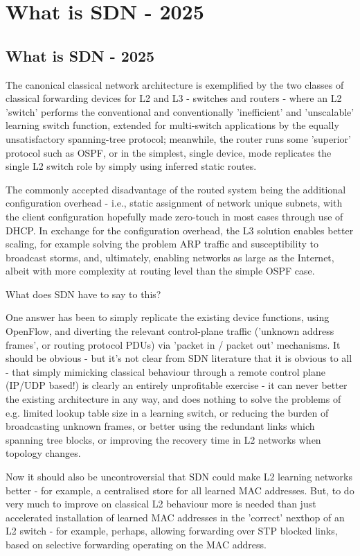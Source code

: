 \section{What is SDN - 2025}

\subsection{What is SDN - 2025}

The canonical classical network architecture is exemplified by the two classes of classical forwarding devices for  L2 and L3 - switches and routers - where an L2 'switch' performs the conventional and conventionally 'inefficient' and 'unscalable' learning switch function, extended for multi-switch applications by the equally unsatisfactory spanning-tree protocol; meanwhile, the router runs some 'superior' protocol such as OSPF, or in the simplest, single device, mode replicates the single L2 switch role by simply using inferred static routes.

The commonly accepted disadvantage of the routed system being the additional configuration overhead - i.e., static assignment of network unique subnets, with the client configuration hopefully made zero-touch in most cases through use of DHCP.
In exchange for the configuration overhead, the L3 solution enables better scaling, for example solving the problem ARP traffic and susceptibility to broadcast storms, and, ultimately, enabling networks as large as the Internet, albeit with more complexity at routing level than the simple OSPF case.

What does SDN have to say to this?

One answer has been to simply replicate the existing device functions, using OpenFlow, and diverting the relevant control-plane traffic ('unknown address frames', or routing protocol PDUs) via 'packet in / packet out' mechanisms.  It should be obvious - but it's not clear from SDN literature that it is obvious to all - that simply mimicking classical behaviour through a remote control plane (IP/UDP based!) is clearly an entirely unprofitable exercise - it can never better the existing architecture in any way, and does nothing to solve the problems of e.g. limited lookup table size in a learning switch, or reducing the burden of broadcasting unknown frames, or better using the redundant links which spanning tree blocks, or improving the recovery time in L2  networks when topology changes.

Now it should also be uncontroversial that SDN could make L2 learning networks better - for example, a centralised store for all learned MAC addresses.  But, to do very much to improve on classical L2 behaviour more is needed than just accelerated installation of learned MAC addresses in the 'correct' nexthop of an L2 switch - for example, perhaps, allowing forwarding over STP blocked links, based on selective forwarding operating on the MAC address.

